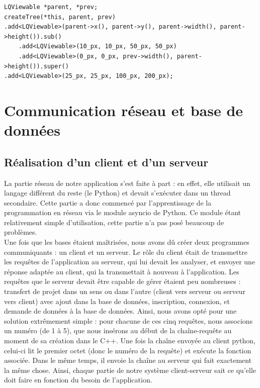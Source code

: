 \documentclass[twoside]{report}
\begin{document}
\begin{lstlisting}[style=cpp, label=exv]
LQViewable *parent, *prev;
createTree(*this, parent, prev)
.add<LQViewable>(parent->x(), parent->y(), parent->width(), parent->height()).sub()
    .add<LQViewable>(10_px, 10_px, 50_px, 50_px)
    .add<LQViewable>(0_px, 0_px, prev->width(), parent->height()).super()
.add<LQViewable>(25_px, 25_px, 100_px, 200_px);
\end{lstlisting}

\newpage

\section{Communication réseau et base de données}
\subsection{Réalisation d'un client et d'un serveur}
La partie réseau de notre application s'est faite à part : en effet, elle utilisait un langage différent du reste (le Python) et devait s'exécuter dans un thread secondaire. Cette partie a donc commencé par l'apprentissage de la programmation en réseau via le module asyncio de Python. Ce module étant relativement simple d'utilisation, cette partie n'a pas posé beaucoup de problèmes. \\
Une fois que les bases étaient maîtrisées, nous avons dû créer deux programmes communiquants : un client et un serveur. Le rôle du client était de transmettre les requêtes de l'application au serveur, qui lui devait les analyser, et envoyer une réponse adaptée au client, qui la transmettait à nouveau à l'application. Les requêtes que le serveur devait être capable de gérer étaient peu nombreuses : transfert de projet dans un sens ou dans l'autre (client vers serveur ou serveur vers client) avec ajout dans la base de données, inscription, connexion, et demande de données à la base de données. Ainsi, nous avons opté pour une solution extrêmement simple : pour chacune de ces cinq requêtes, nous associons un numéro (de 1 à 5), que nous insérons au début de la chaîne-requête au moment de sa création dans le C++. Une fois la chaîne envoyée au client python, celui-ci lit le premier octet (donc le numéro de la requête) et exécute la fonction associée. Dans le même temps, il envoie la chaîne au serveur qui fait exactement la même chose. Ainsi, chaque partie de notre système client-serveur sait ce qu'elle doit faire en fonction du besoin de l'application.
\end{document}
